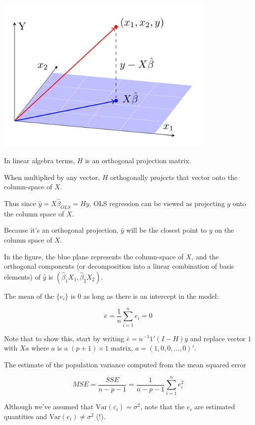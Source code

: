 \documentclass[
  letterpaper,
  DIV=11,
  numbers=noendperiod]{scrreport}
\begin{document}
\includegraphics[width=0.8\textwidth,height=\textheight]{week4/../week2/standalone_figures/normal_equation_projection/normal_equation_projection.svg}

In linear algebra terms, \(H\) is an orthogonal projection matrix.

When multiplied by any vector, \(H\) orthogonally projects that vector
onto the column-space of \(X\).

Thus since \(\hat y = X \hat \beta_{OLS} = Hy\), OLS regression can be
viewed as projecting \(y\) onto the column space of \(X\).

Because it's an orthogonal projection, \(\hat y\) will be the closest
point to \(y\) on the column space of \(X\).

In the figure, the blue plane represents the column-space of \(X\), and
the orthogonal components (or decomposition into a linear combination of
basis elements) of \(\hat y\) is
\((\hat \beta_1 X_1, \hat \beta_2 X_2)\).

The mean of the \(\{ e_i \}\) is 0 as long as there is an intercept in
the model:

\[ \bar e = \frac{1}{n} \sum_{i=1}^n e_i = 0 \]

Note that to show this, start by writing \(\bar e = n^{-1} 1'(I-H)y\)
and replace vector \(1\) with \(Xa\) where \(a\) is a \((p+1) \times 1\)
matrix, \(a = (1, 0, 0, ..., 0)'\).

The estimate of the population variance computed from the mean squared
error

\[MSE = \frac{SSE}{n - p - 1} = \frac{1}{n-p-1}\sum_{i=1}^n e_i^2\]

Although we've assumed that \(\text{Var}(\varepsilon_i) = \sigma^2\),
note that the \(e_i\) are estimated quantities and
\(\text{Var}(e_i) \neq \sigma^2\) (!).
\end{document}
